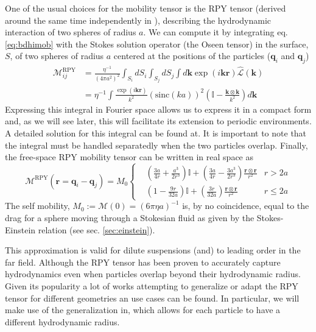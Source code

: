 \documentclass[ twoside,openright,titlepage,numbers=noenddot,%
headinclude,footinclude,cleardoublepage=empty,abstract=on,
BCOR=5mm,paper=a4,fontsize=11pt, dvipsnames
]{scrreprt}
\renewcommand{\vec}[1]{\bm{#1}}
\newcommand{\tens}[1]{\bm{\mathcal{#1}}}
\newcommand{\oper}[1]{\mathcal{#1}}
\newcommand{\sinc}{\textrm{sinc}}
\newcommand{\ppos}{q}
\begin{document}
One of the usual choices for the mobility tensor is the \gls{RPY} tensor (derived around the same time independently in \cite{Rotne1969,Yamakawa1970}), describing the hydrodynamic interaction of two spheres of radius $a$. We can compute it by integrating eq. \eqref{eq:bdhimob} with the Stokes solution operator (the Oseen tensor) in the surface, $S$, of two spheres of radius $a$ centered at the positions of the particles ($\vec{\ppos}_i$ and $\vec{\ppos}_j$)
\begin{equation}
  \label{eq:rpymobfour}
  \begin{aligned}
    \tens{M}_{ij}^{\textrm{RPY}} &= \frac{\eta^{-1}}{(4\pi a^2)^2} \int_{S_i}dS_i\int_{S_j}dS_j \int d\vec{k} \exp(i\vec{k}\vec{r})\hat{\oper{L}}(\vec{k})\\
    &= \eta^{-1} \int \frac{\exp(i\vec{k}\vec{r})}{k^2}\left(\sinc(ka) \right)^2\left(\mathbb{I} - \frac{\vec{k}\otimes\vec{k}}{k^2}\right)d\vec{k}
\end{aligned}
\end{equation}
Expressing this integral in Fourier space allows us to express it in a compact form and, as we will see later, this will facilitate its extension to periodic environments.
A detailed solution for this integral can be found at\cite{Wajnryb2013}. It is important to note that the integral must be handled separatedly when the two particles overlap.
Finally, the free-space \gls{RPY} mobility tensor can be written in real space as\cite{Wajnryb2013}
\begin{equation}
  \label{eq:rpy}
  \tens{M}^{\textrm{RPY}}(\vec{r} = \vec{q}_i-\vec{q}_j) = M_0\left\{
  \begin{aligned}
    &\left( \frac{3a}{4r} + \frac{a^3}{2r^3} \right)\mathbb{I} + \left(\frac{3a}{4r} - \frac{3a^3}{2r^3}\right)\frac{\vec{r}\otimes\vec{r}}{r^2}  & r > 2a\\
    &\left(1 - \frac{9r}{32a} \right)\mathbb{I} + \left( \frac{3r}{32a} \right)\frac{\vec{r}\otimes\vec{r}}{r^2} & r \le 2a
  \end{aligned}\right.
\end{equation}
The self mobility, $M_0 := \tens{M}(0) = (6\pi\eta a)^{-1}$ is, by no coincidence, equal to the drag for a sphere moving through a Stokesian fluid as given by the Stokes-Einstein relation\cite{Dhont1996} (see sec. \ref{sec:einstein}).

This approximation is valid for dilute suspensions (and) to leading order in the far field. Although the \gls{RPY} tensor has been proven to accurately capture hydrodynamics even when particles overlap beyond their hydrodynamic radius\cite{Ermak1978}\cite{Wajnryb2013}.
Given its popularity a lot of works attempting to generalize or adapt the \gls{RPY} tensor for different geometries an use cases can be found\cite{Wajnryb2013,Liang2013,Guan2018,Fiore2017}. In particular, we will make use of the generalization in\cite{Zuk2014}, which allows for each particle to have a different hydrodynamic radius.
\end{document}
